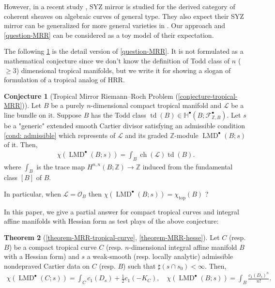 \documentclass[a4paper,dvipdfmx,reqno,12pt]{amsart}
\theoremstyle{definition}
\newtheorem{theorem}{Theorem}[section]
\newtheorem{conjecture}[theorem]{Conjecture}
\newcommand{\Z}{\mathbb{Z}}%
\newcommand{\mb}[1]{\mathbb{#1}}%
\newcommand{\mcal}[1]{\mathcal{#1}}%
\newcommand{\opn}[1]{\operatorname{#1}}
\numberwithin{equation}{section}
\begin{document}
However, in a recent study 
\cite{auroux2022lagrangian}, 
SYZ mirror is studied for the derived category 
of coherent sheaves on algebraic curves 
of general type. 
They also expect their SYZ mirror can be generalized for more
general varieties in \cite[{}]{auroux2022lagrangian}.
Our approach and \cref{question-MRR} can be considered as 
a toy model of their expectation. 

The following \cref{conjecture-tropical-MRR-preface}
is the detail version of \cref{question-MRR}.
It is not formulated as a mathematical 
conjecture since we don't know the definition of Todd 
class of $n$ ($\geq 3$) dimensional tropical manifolds,
but we write it for showing a slogan of formulation 
of a tropical analog of HRR.

\begin{conjecture}[{Tropical Mirror Riemann--Roch Problem
(\cref{conjecture-tropical-MRR})}]
\label{conjecture-tropical-MRR-preface}
Let $B$ be a purely $n$-dimensional compact tropical manifold and $\mcal{L}$
be a line bundle on it. Suppose $B$ has the Todd class
$\opn{td}(B) \in \mb{H}^{\bullet}(B;\mcal{F}_{\Z, B}^{\bullet})$.
 Let $s$ be a "generic"
extended smooth Cartier divisor satisfying an admissible condition 
\cref{cond: admissible} which represents of $\mcal{L}$
and its graded $\Z$-module $\opn{LMD}^{\bullet}(B;s)$
of it.
Then,
\begin{align}
\chi(\opn{LMD}^{\bullet}(B;s))=\int_B \opn{ch}(\mcal{L})\opn{td}(B).
\end{align}
where $\int_B$ is the trace map 
$H^{n,n}(B;\mathbb{Z})\to \mathbb{Z}$
induced from the fundamental class $[B]$ of $B$.

In particular, when $\mcal{L}=\mcal{O}_B$ then
$\chi(\opn{LMD}^{\bullet}(B;s))=\chi_{\opn{top}}(B)$ ?
\end{conjecture}



In this paper, we give a partial answer for compact tropical curves 
and integral affine manifolds with Hessian form
as test plays of the above conjecture:

\begin{theorem}[{\cref{theorem-MRR-tropical-curve},
\cref{theorem-MRR-hesse}}] \label{thm: main}
Let $C$ (resp. $B$) be a compact tropical curve $C$ 
(resp. $n$-dimensional integral 
affine manifold $B$
with a Hessian form) and $s$ a
weak-smooth (resp. locally analytic) admissible nondepraved
Cartier data on $C$ (resp. $B$) such that 
$\sharp(s\cap s_0)<\infty$. Then,
\begin{align}
\chi(\opn{LMD}^{\bullet}(C;s))=\int_C c_1(D_s)+\frac{1}{2}c_1(-K_C), \quad 
\chi(\opn{LMD}^{\bullet}(B;s))=\int_B \frac{c_1(D_s)^{n}}{n!}.
\end{align}
\end{theorem}
\end{document}
